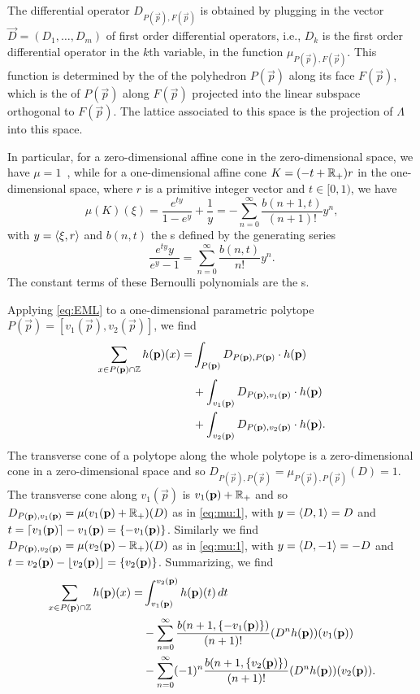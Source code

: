 The differential operator $D_{P(\vec p),F(\vec p)}$ is obtained
by plugging in the vector $\vec D=(D_1,\ldots,D_m)$ of first
order differential operators, i.e., $D_k$ is the first order
differential operator in the $k$th variable,
in the function $\mu_{P(\vec p),F(\vec p)}$.
This function is determined by the 
of the polyhedron $P(\vec p)$ along its face $F(\vec p)$,
which is the  of $P(\vec p)$ along $F(\vec p)$
projected into the linear subspace orthogonal to $F(\vec p)$.
The lattice associated to this space is the projection of
$\Lambda$ into this space.

In particular, for a zero-dimensional affine cone in the zero-dimensional
space, we have $\mu = 1$~\cite[Proposition 12]{Berline2006local},
while for a one-dimensional affine
cone $K = (-t + \mathbb{R}_+) r$ in the one-dimensional space, where
$r$ is a primitive integer vector and $t \in [0,1)$,
we have~\cite[(13)]{Berline2006local}
\begin{equation}
\label{eq:mu:1}
\mu(K)(\xi) = \frac{e^{t y}}{1-e^y} + \frac 1{y}
= -\sum_{n=0}^\infty \frac{b(n+1, t)}{(n+1)!} y^n
,
\end{equation}
with $y = \langle \xi, r\rangle$ and $b(n,t)$ the s
defined by the generating series
$$
\frac{e^{ty} y}{e^y - 1} = \sum_{n=0}^\infty \frac{b(n,t)}{n!} y^n
.
$$
The constant terms of these Bernoulli polynomials
are the s.

Applying \eqref{eq:EML} to a one-dimensional parametric polytope
$P(\vec p) = [v_1(\vec p), v_2(\vec p)]$, we find
$$
\begin{aligned}
\sum_{x \in P(\vec p) \cap \ZZ} h(\vec p)(x)
= & \int_{P(\vec p)} D_{P(\vec p), P(\vec p)} \cdot h(\vec p)
\\
& + \int_{v_1(\vec p)} D_{P(\vec p), v_1(\vec p)} \cdot h(\vec p)
\\
& + \int_{v_2(\vec p)} D_{P(\vec p), v_2(\vec p)} \cdot h(\vec p)
.
\end{aligned}
$$
The transverse cone of a polytope along the whole polytope is
a zero-dimensional cone in a zero-dimensional space and so
$D_{P(\vec p), P(\vec p)} = \mu_{P(\vec p), P(\vec p)}(D) = 1$.
The transverse cone along $v_1(\vec p)$ is $v_1(\vec p) + \RR_+$
and so $D_{P(\vec p), v_1(\vec p)} = \mu(v_1(\vec p) + \RR_+)(D)$
as in \eqref{eq:mu:1}, with $y = \langle D, 1\rangle = D$ and
$t = \ceil{v_1(\vec p)} - v_1(\vec p) =
\fractional{-v_1(\vec p)}$.
Similarly we find
$D_{P(\vec p), v_2(\vec p)} = \mu(v_2(\vec p) - \RR_+)(D)$
as in \eqref{eq:mu:1}, with $y = \langle D, -1\rangle = -D$ and
$t = v_2(\vec p) - \floor{v_2(\vec p)} =
\fractional{v_2(\vec p)}$.
Summarizing, we find
$$
\begin{aligned}
\sum_{x \in P(\vec p) \cap \ZZ} h(\vec p)(x)
= & \int_{v_1(\vec p)}^{v_2(\vec p)} h(\vec p)(t) \, dt
\\
& -\sum_{n=0}^\infty \frac{b(n+1, \fractional{-v_1(\vec p)})}{(n+1)!}
	(D^n h(\vec p))(v_1(\vec p))
\\
& -\sum_{n=0}^\infty (-1)^n \frac{b(n+1, \fractional{v_2(\vec p)})}{(n+1)!}
	(D^n h(\vec p))(v_2(\vec p))
.
\end{aligned}
$$

